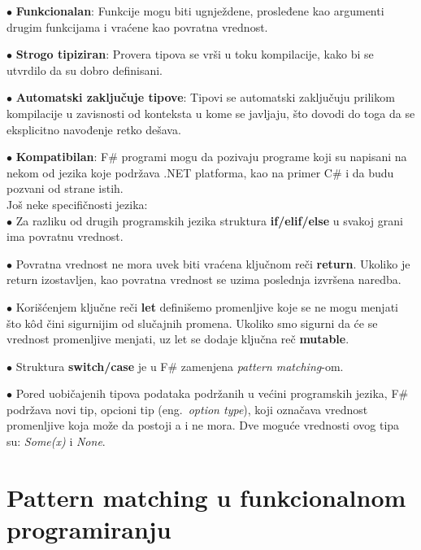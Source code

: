 \documentclass[a4paper]{article}
\begin{document}
	$\bullet$ \textbf{Funkcionalan}: Funkcije mogu biti ugnježdene, prosleđene kao argumenti drugim funkcijama i vraćene kao povratna vrednost.

	$\bullet$ \textbf{Strogo tipiziran}: Provera tipova se vrši u toku kompilacije, kako bi se utvrdilo da su dobro definisani. 

	$\bullet$ \textbf{Automatski zaključuje tipove}: Tipovi se automatski zaključuju prilikom kompilacije u zavisnosti od konteksta u kome se javljaju, što dovodi do toga da se eksplicitno navođenje retko dešava.

	$\bullet$ \textbf{Kompatibilan}: F\# programi mogu da pozivaju programe koji su napisani na nekom od jezika koje podržava .NET platforma, kao na primer C\# i da budu pozvani od strane istih. 
\\
 
	Još neke specifičnosti jezika: \\
	
	$\bullet$ Za razliku od drugih programskih jezika struktura \textbf{if/elif/else} u svakoj grani ima povratnu vrednost.
	 
	$\bullet$ Povratna vrednost ne mora uvek biti vraćena ključnom reči \textbf{return}. Ukoliko je return izostavljen, kao povratna vrednost se uzima poslednja izvršena naredba.
	 
	$\bullet$ Korišćenjem ključne reči \textbf{let} definišemo promenljive koje se ne mogu menjati što kôd čini sigurnijim od slučajnih promena. Ukoliko smo sigurni da će se vrednost promenljive menjati, uz let se dodaje ključna reč \textbf{mutable}.
	 
	$\bullet$ Struktura \textbf{switch/case} je u F\# zamenjena {\em pattern matching}-om\cite{expertFS}.
	 
$\bullet$ Pored uobičajenih tipova podataka podržanih u većini programskih jezika, F\# podržava novi tip, opcioni tip (eng.~{\em option type}), koji označava vrednost promenljive koja može da postoji a i ne mora. Dve moguće vrednosti ovog tipa su: {\em Some(x)} i {\em None}.

\section{Pattern matching u funkcionalnom programiranju}
\end{document}
